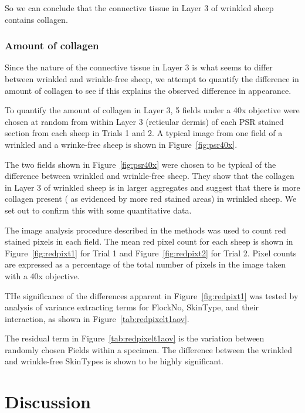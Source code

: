 \documentclass[titlepage]{article}  %
\begin{document}
So we can conclude that the  connective tissue in Layer 3 of wrinkled sheep contains collagen. 

\subsubsection{Amount of collagen}
Since the nature of the connective tissue in Layer 3 is what seems to differ between wrinkled and wrinkle-free sheep, we attempt to quantify the difference in amount of collagen to see if this explains the observed difference in appearance.

To quantify the amount of collagen in Layer 3, 5 fields under a 40x objective were chosen at random from within Layer 3 (reticular dermis) of each PSR stained section from each sheep in Trials 1 and 2. A typical image from one field of a wrinkled and a wrinke-free sheep is shown in Figure~\ref{fig:psr40x}.

The two fields shown in Figure~\ref{fig:psr40x} were chosen to be typical of the difference between wrinkled and wrinkle-free sheep. They show that the collagen in Layer 3 of wrinkled sheep is in larger aggregates and suggest that there is more collagen present ( as evidenced by more red stained areas) in wrinkled sheep. We set out to confirm this with some quantitative data.

 The image analysis procedure described in the methods was used to count red stained pixels in each field. The mean red pixel count for each sheep is shown  in Figure~\ref{fig:redpixt1} for Trial 1 and Figure~\ref{fig:redpixt2} for Trial 2.
%
%
Pixel counts are expressed as a percentage of the total number of pixels in the image taken with a 40x objective.

THe significance of the differences apparent in Figure~\ref{fig:redpixt1} was tested by analysis of variance extracting terms for FlockNo, SkinType, and their interaction, as shown in Figure~\ref{tab:redpixelt1aov}.

The residual term in Figure~\ref{tab:redpixelt1aov} is the variation between randomly chosen Fields within a specimen. The difference between the wrinkled and wrinkle-free SkinTypes is shown to be highly significant.




\clearpage
\section{Discussion}
\end{document}

